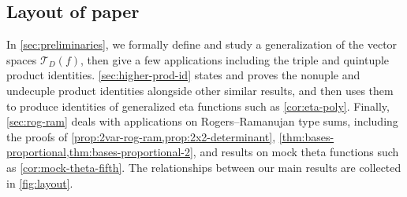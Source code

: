 \documentclass[reqno,11pt]{amsart}
\theoremstyle{definition}
\theoremstyle{remark}
\numberwithin{equation}{section}
\newcommand{\mT}{\mathcal{T}}
\begin{document}
\subsection{Layout of paper} 
In \cref{sec:preliminaries}, we formally define and study a generalization of the vector spaces $\mT_D(f)$, then give a few applications including the triple and quintuple product identities. %
\cref{sec:higher-prod-id} states and proves the nonuple and undecuple product identities alongside other similar results,
and then uses them to produce identities of generalized eta functions such as \cref{cor:eta-poly}. Finally, \cref{sec:rog-ram} deals with applications on Rogers--Ramanujan type sums, including the proofs of \cref{prop:2var-rog-ram,prop:2x2-determinant}, \cref{thm:bases-proportional,thm:bases-proportional-2}, and results on mock theta functions such as \cref{cor:mock-theta-fifth}. The relationships between our main results are collected in \cref{fig:layout}.
\end{document}
